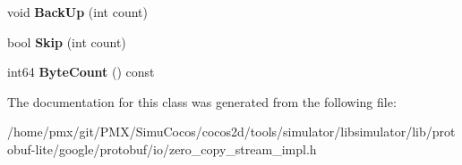 \begin{DoxyCompactItemize}
\mbox{\label{classgoogle_1_1protobuf_1_1io_1_1LimitingInputStream_a2adfd17c336ec61b54c8faad5e599f5b}} 
void {\bfseries Back\+Up} (int count)
\item 
\mbox{\label{classgoogle_1_1protobuf_1_1io_1_1LimitingInputStream_a1a25b253b34bc51576e185d3dd560dcc}} 
bool {\bfseries Skip} (int count)
\item 
\mbox{\label{classgoogle_1_1protobuf_1_1io_1_1LimitingInputStream_a90b822e0f3341e0d40af50d4076380cf}} 
int64 {\bfseries Byte\+Count} () const
\end{DoxyCompactItemize}


The documentation for this class was generated from the following file\+:\begin{DoxyCompactItemize}
\item 
/home/pmx/git/\+P\+M\+X/\+Simu\+Cocos/cocos2d/tools/simulator/libsimulator/lib/protobuf-\/lite/google/protobuf/io/zero\+\_\+copy\+\_\+stream\+\_\+impl.\+h\end{DoxyCompactItemize}
